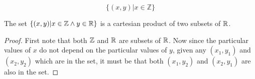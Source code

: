 \documentclass[main.tex]{subfiles}
\begin{document}
\subproblem{}\label{10a}

\[\{(x, y) | x \in \mathbb{Z}\}\]

\begin{thm}
	The set \(\{(x,y)|x \in \mathbb{Z} \land y \in \mathbb{R}\}\) is
	a cartesian product of two subsets of \(\mathbb{R}\).
\end{thm}
\begin{proof}
	First note that both \(\mathbb{Z}\) and \(\mathbb{R}\) are subsets of
	\(\mathbb{R}\). Now since the particular values of \(x\) do not depend on
	the particular values of \(y\), given any \((x_1, y_1)\) and
	\((x_2, y_2)\) which are in the set, it must be that both \((x_1, y_2)\)
	and \((x_2, y_1)\) are also in the set.
\end{proof}
\end{document}
